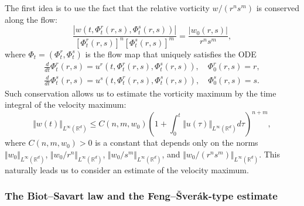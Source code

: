 \documentclass[11pt]{amsart}
\theoremstyle{definition}
\theoremstyle{remark}
\numberwithin{equation}{section}
\numberwithin{equation}{section}
\newcommand{\nrm}[1]{\Vert#1\Vert}
\newcommand{\0}{\emptyset}
\newcommand{\ift}{\infty}
\newcommand{\bbR}{\mathbb R}
\begin{document}
	The first idea is to use the fact that the relative vorticity $w/(r^{n}s^{m})$ is conserved along the flow:
	\begin{equation}
		\frac{|w(t,\Phi_{t}^{r}(r,s),\Phi_{t}^{s}(r,s))|}{[\Phi_{t}^{r}(r,s)]^{n}[\Phi_{t}^{s}(r,s)]^{m}}=\frac{|w_{0}(r,s)|}{r^{n}s^{m}},
	\end{equation}
	where $\Phi_{t}=(\Phi_{t}^{r},\Phi_{t}^{s})$ is the flow map that uniquely satisfies the ODE
	\begin{equation}
		\begin{aligned}
			\frac{d}{dt}\Phi_{t}^{r}(r,s)=u^{r}(t,\Phi_{t}^{r}(r,s),\Phi_{t}^{s}(r,s)),\quad \Phi_{0}^{r}(r,s)=r,\\
			\frac{d}{dt}\Phi_{t}^{s}(r,s)=u^{s}(t,\Phi_{t}^{r}(r,s),\Phi_{t}^{s}(r,s)),\quad \Phi_{0}^{s}(r,s)=s.
		\end{aligned}
	\end{equation}
	Such conservation allows us to estimate the vorticity maximum by the time integral of the velocity maximum:	
	\begin{equation}\label{eq:wtmax}
		\nrm{w(t)}_{L^{\ift}(\bbR^{d})}\leq C(n,m,w_{0})\left(1+\int_{0}^{t}\nrm{u(\tau)}_{L^{\ift}(\bbR^{d})}d\tau\right)^{n+m},
	\end{equation}
	where $C(n,m,w_{0})>0$ is a constant that depends only on the norms $\nrm{w_{0}}_{L^{\ift}(\bbR^{d})}$, $\nrm{w_{0}/r^{n}}_{L^{\ift}(\bbR^{d})} $, $\nrm{w_{0}/s^{m}}_{L^{\ift}(\bbR^{d})}$, and $\nrm{w_{0}/(r^{n}s^{m})}_{L^{\ift}(\bbR^{d})}$. This naturally leads us to consider an estimate of the velocity maximum.
	
	\subsubsection{The Biot--Savart law and the Feng--\v{S}ver\'{a}k-type estimate}
	
\end{document}
